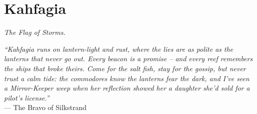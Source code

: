 \documentclass[12pt,oneside]{book}
\begin{document}
\chapter{Kahfagia}
\emph{The Flag of Storms.}

\noindent
\textit{``Kahfagia runs on lantern-light and rust, where the lies are as polite as the lanterns that never go out. Every beacon is a promise -- and every reef remembers the ships that broke theirs. Come for the salt fish, stay for the gossip, but never trust a calm tide: the commodores know the lanterns fear the dark, and I've seen a Mirror-Keeper weep when her reflection showed her a daughter she'd sold for a pilot's license.''} \\
--- The Bravo of Silkstrand

\vspace{1em}
\end{document}

